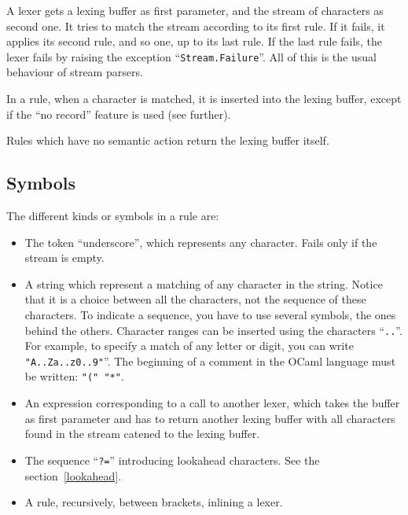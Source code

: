 \documentclass[11pt]{article}
\begin{document}
A lexer gets a lexing buffer as first parameter, and the stream of
characters as second one. It tries to match the stream according
to its first rule. If it fails, it applies its second rule, and so
one, up to its last rule. If the last rule fails, the lexer fails
by raising the exception ``\verb/Stream.Failure/''. All of this
is the usual behaviour of stream parsers.

In a rule, when a character is matched, it is inserted into the lexing
buffer, except if the ``no record'' feature is used (see further).

Rules which have no semantic action return the lexing buffer itself.

\subsection{Symbols}

The different kinds or symbols in a rule are:

\begin{itemize}

\item The token ``underscore'', which represents any
  character. Fails only if the stream is empty.

\item A string which represent a matching of any character in the
  string. Notice that it is a choice between all the characters, not
  the sequence of these characters. To indicate a sequence, you have
  to use several symbols, the ones behind the others. Character ranges
  can be inserted using the characters ``\verb/../''. For example, to
  specify a match of any letter or digit, you can write
  \verb/"A..Za..z0..9"/''. The beginning of a comment in the OCaml
  language must be written: \verb/"(" "*"/.

\item An expression corresponding to a call to another lexer, which
  takes the buffer as first parameter and has to return another lexing
  buffer with all characters found in the stream catened to the lexing
  buffer.

\item The sequence ``\verb/?=/'' introducing lookahead characters.
  See the section~\ref{lookahead}.

\item A rule, recursively, between brackets, inlining a lexer.

\end{itemize}
\end{document}
